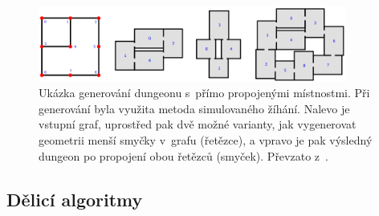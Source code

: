 \begin{figure}[hbt]
    \centering
    \includegraphics[width=0.9\textwidth]{obrazky/dung_simul_anneal.png}
    \caption{Ukázka generování dungeonu s~přímo propojenými místnostmi. Při generování byla využita metoda simulovaného žíhání. Nalevo je vstupní graf, uprostřed pak dvě možné varianty, jak vygenerovat geometrii menší smyčky v~grafu (řetězce), a vpravo je pak výsledný dungeon po propojení obou řetězců (smyček). Převzato z~\cite{lit:dung_simul_anneal}.}
    \label{img:dung_simul_anneal}
\end{figure}


\subsection{Dělicí algoritmy}


